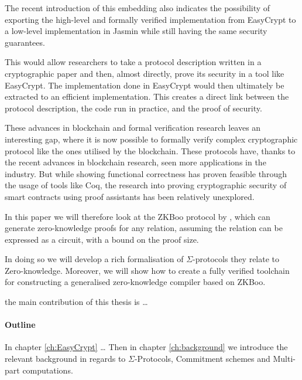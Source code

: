 The recent introduction of this embedding also indicates the possibility of
exporting the high-level and formally verified implementation from
EasyCrypt to a low-level implementation in Jasmin while still having the same
security guarantees.

This would allow researchers to take a protocol description written in a
cryptographic paper and then, almost directly, prove its security in a tool like EasyCrypt.
The implementation done in EasyCrypt would then ultimately be extracted to an efficient implementation.
This creates a direct link between the protocol description, the code run in
practice, and the proof of security.

These advances in blockchain and formal verification research leaves an
interesting gap, where it is now possible to formally verify complex
cryptographic protocol like the ones utilised by the blockchain.
These protocols have, thanks to the recent advances in blockchain research, seen more
applications in the industry.
But while showing functional correctness has proven feasible through the usage of tools like
Coq, the research into proving cryptographic security of smart contracts using
proof assistants has been relatively unexplored.

In this paper we will therefore look at the ZKBoo protocol by \citet{zkboo},
which can generate zero-knowledge proofs for any relation, assuming the relation
can be expressed as a circuit, with a bound on the proof size.

In doing so we will develop a rich formalisation of $\Sigma$-protocols they
relate to Zero-knowledge. Moreover, we will show how to create a fully verified
toolchain for constructing a generalised zero-knowledge compiler based on ZKBoo.

the main contribution of this thesis is \dots


\paragraph{Outline}
In chapter \ref{ch:EasyCrypt} \dots
Then in chapter \ref{ch:background} we introduce the relevant background
in regards to $\Sigma$-Protocols, Commitment schemes and Multi-part computations.

